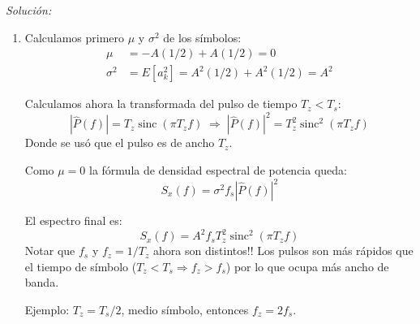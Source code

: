 \documentclass[a4paper,11pt]{article}
\DeclareMathOperator{\sinc}{sinc}
\newenvironment{solucion}[1][]{
\noindent \large \textsl{Solución:} \ifthenelse{\equal{#1}{}}{}{\emph{(#1)}}

\smallskip
}{
\bigskip
}
\begin{document}
\begin{solucion}

        \begin{enumerate}
        \item Calculamos primero $\mu$ y $\sigma^2$ de los símbolos:
        \begin{align*}
                \mu &= -A (1/2) + A (1/2) = 0 \\
                \sigma^2 &= E[a_k^2] = A^2 (1/2) + A^2(1/2) = A^2
        \end{align*}
        
        Calculamos ahora la transformada del pulso de tiempo $T_z<T_s$:
        \begin{equation*}
                |\hat{P}(f)| = T_z \sinc (\pi T_z f) \; \Rightarrow \; |\hat{P}(f)|^2 = T_z^2 \sinc^2 (\pi T_z f)
        \end{equation*}
        Donde se usó que el pulso es de ancho $T_z$.

        Como $\mu=0$ la fórmula de densidad espectral de potencia queda:
        \begin{equation*}
                S_x(f) = \sigma^2 f_s |\hat{P}(f)|^2
        \end{equation*}
        
        El espectro final es:
        \begin{equation*}
                S_x(f) = A^2 f_s T_z^2 \sinc^2(\pi T_z f)
        \end{equation*}
        Notar que $f_s$ y $f_z = 1/T_z$ ahora son distintos!! Los pulsos son más rápidos que el tiempo de símbolo ($T_z<T_s \Rightarrow f_z > f_s$) por lo que ocupa más ancho de banda.

        Ejemplo: $T_z = T_s/2$, medio símbolo, entonces $f_z = 2f_s$.
        \begin{center}
\end{center}
\end{enumerate}
\end{solucion}
\end{document}
